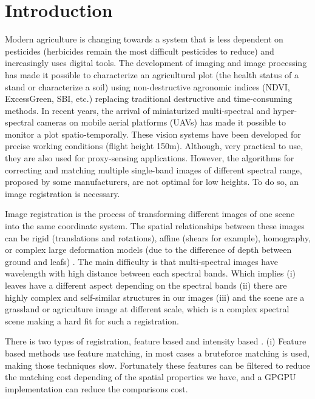 \documentclass[]{elsarticle}
\begin{document}
	\newpage
	
	\section{Introduction}
	
	\par Modern agriculture is changing towards a system that is less dependent on pesticides \cite{10.1371/journal.pone.0097922} (herbicides remain the most difficult pesticides to reduce) and increasingly uses digital tools. The development of imaging and image processing has made it possible to characterize an agricultural plot (the health status of a stand or characterize a soil) using non-destructive agronomic indices (NDVI, ExcessGreen, SBI, etc.) replacing traditional destructive and time-consuming methods. In recent years, the arrival of miniaturized multi-spectral and hyper-spectral cameras on mobile aerial platforms (UAVs) has made it possible to monitor a plot spatio-temporally. These vision systems have been developed for precise working conditions (flight height 150m). Although, very practical to use, they are also used for proxy-sensing applications. However, the algorithms for correcting and matching multiple single-band images of different spectral range, proposed by some manufacturers, are not optimal for low heights. To do so, an image registration is necessary.
	\\
	\par Image registration is the process of transforming different images of one scene into the same coordinate system.
	The spatial relationships between these images can be rigid (translations and rotations), affine (shears for example),
	homography, or complex large deformation models (due to the difference of depth between ground and leafs) \cite{Kamoun}.
	The main difficulty is that multi-spectral images have wavelength with high distance between each spectral bands.
	Which implies (i) leaves have a different aspect depending on the spectral bands
	(ii) there are highly complex and self-similar structures in our images
	(iii) and the scene are a grassland or agriculture image at different scale,
	which is a complex spectral scene making a hard fit for such a registration.
	\\
	\par There is two types of registration, feature based and intensity based \cite{Zitova}.
	(i) Feature based methods use feature matching, in most cases a bruteforce matching is used, making those techniques slow.
	Fortunately these features can be filtered to reduce the matching cost depending of the spatial properties we have, and a GPGPU implementation can reduce the comparisons cost.
\end{document}
